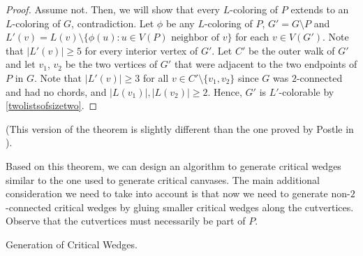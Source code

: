 \begin{proof}
Assume not. Then, we will show that every $L$-coloring of $P$ extends to an $L$-coloring of $G$, contradiction. Let $\phi$ be any $L$-coloring of $P$, 
$G' = G \setminus P$ and $L'(v) = L(v) \setminus \{\phi(u) : u \in V(P) \text{ neighbor of } v \}$ for each $v \in V(G')$. 
Note that $|L'(v)| \geq 5$ for every interior vertex of $G'$. Let $C'$ be the outer walk of $G'$ and let $v_1$, $v_2$ be the two vertices of 
$G'$ that were adjacent to the two endpoints of $P$ in $G$. Note that $|L'(v)| \geq 3$ for all $v \in C' \setminus \{v_1, v_2\}$ since 
$G$ was $2$-connected and had no chords, and $|L(v_1)|, |L(v_2)| \geq 2$. Hence, $G'$ is $L'$-colorable by \ref{twolistsofsizetwo}.
\end{proof}

(This version of the theorem is slightly different than the one proved by Postle in \cite{postlethesis}).

Based on this theorem, we can design an algorithm to generate critical wedges similar to the one used to generate critical canvases.  
The main additional consideration we need to take into account is that now we need to generate non-$2$-connected critical wedges by 
gluing smaller critical wedges along the cutvertices. Observe that the cutvertices must necessarily be part of $P$.


\begin{algorithm}[H]
\caption{Generation of Critical Wedges.}
\SetAlgoLined
{}



\end{algorithm}


